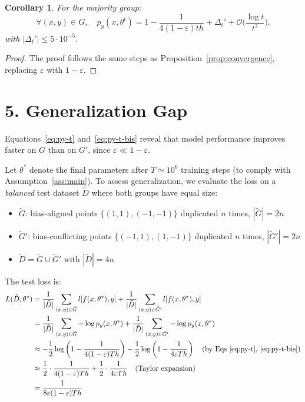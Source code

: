 \documentclass[11pt]{article}
\newtheorem{corollary}{Corollary}
\begin{document}
\begin{corollary}
\label{cor:majority}
For the majority group:
\begin{equation}
\label{eq:py-t-bis}
\forall (x, y) \in G, \quad p_y(x, \theta^t) = 1 - \frac{1}{4(1-\varepsilon)th} + \Delta_t' + \mathcal{O}\Big(\frac{\log t}{t^2}\Big).
\end{equation}
with $|\Delta_t'| \leq 5\cdot10^{-5}$.
\end{corollary}

\begin{proof}
The proof follows the same steps as Proposition~\ref{prop:convergence}, replacing $\varepsilon$ with $1 - \varepsilon$.
\end{proof}

\section*{5. Generalization Gap}

Equations~\eqref{eq:py-t} and~\eqref{eq:py-t-bis} reveal that model performance improves faster on $G$ than on $G'$, since $\varepsilon \ll 1 - \varepsilon$.

Let $\theta^*$ denote the final parameters after $T\simeq 10^6$ training steps (to comply with Assumption~\ref{ass:main}). To assess generalization, we evaluate the loss on a \textit{balanced} test dataset $\tilde{D}$ where both groups have equal size:
\begin{itemize}
\item $\tilde{G}$: bias-aligned points $\{(1,1), (-1,-1)\}$ duplicated $n$ times, $|\tilde{G}| = 2n$
\item $\tilde{G}'$: bias-conflicting points $\{(-1,1), (1,-1)\}$ duplicated $n$ times, $|\tilde{G}'| = 2n$
\item $\tilde{D} = \tilde{G} \cup \tilde{G}'$ with $|\tilde{D}| = 4n$
\end{itemize}

The test loss is:
\begin{align*}
L(\tilde{D}, \theta^*) 
&= \frac{1}{|\tilde{D}|} \sum_{(x,y) \in \tilde{G}} l[f(x, \theta^*), y] + \frac{1}{|\tilde{D}|} \sum_{(x,y) \in \tilde{G}'} l[f(x, \theta^*), y] \\
& = \frac{1}{|\tilde{D}|} \sum_{(x, y) \in\tilde{G}} -\log p_y(x, \theta^*) + \frac{1}{|\tilde{D}|} \sum_{(x, y) \in \tilde{G}^\prime} -\log p_y(x, \theta^*)\\
&\approx -\frac{1}{2}\log\left(1 - \frac{1}{4(1-\varepsilon)Th}\right) - \frac{1}{2}\log\left(1 - \frac{1}{4\varepsilon Th}\right) \quad \text{(by Eqs~\eqref{eq:py-t},~\eqref{eq:py-t-bis})} \\
&\approx \frac{1}{2} \cdot \frac{1}{4(1-\varepsilon)Th} + \frac{1}{2} \cdot \frac{1}{4\varepsilon Th} \quad \text{(Taylor expansion)} \\
&= \frac{1}{8\varepsilon(1-\varepsilon)Th}
\end{align*}
\end{document}
